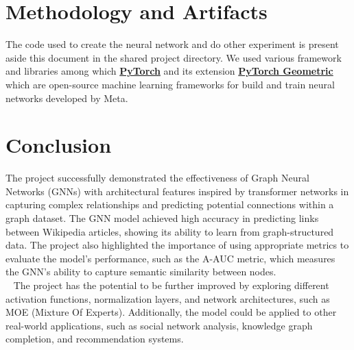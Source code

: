 \documentclass[11pt]{article}
\begin{document}
	\section{Methodology and Artifacts}
	The code used to create the neural network and do other experiment is present aside this document in the shared project directory. We used various framework and libraries among which  \href{https://pytorch.org/}{\textbf{PyTorch}} and its extension \href{https://pytorch-geometric.readthedocs.io/en/latest/}{\textbf{PyTorch Geometric}} \cite{fey2019fastgraphrepresentationlearning} which are open-source machine learning frameworks for build and train neural networks developed by Meta.
	

	\section{Conclusion}
	The project successfully demonstrated the effectiveness of Graph Neural Networks (GNNs) with architectural features inspired by transformer networks in capturing complex relationships and predicting potential connections within a graph dataset.  The GNN model achieved high accuracy in predicting links between Wikipedia articles, showing its ability to learn from graph-structured data.  The project also highlighted the importance of using appropriate metrics to evaluate the model's performance, such as the A-AUC metric, which measures the GNN's ability to capture semantic similarity between nodes.\\    
	The project has the potential to be further improved by exploring different activation functions, normalization layers, and network architectures, such as MOE (Mixture Of Experts).  Additionally, the model could be applied to other real-world applications, such as social network analysis, knowledge graph completion, and recommendation systems. 
	
	
	\clearpage
	
	
	
	
\end{document}
